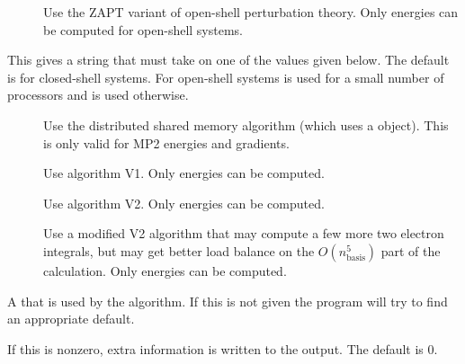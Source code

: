 \begin{description}
\begin{description}
        \item[] Use the ZAPT variant of open-shell perturbation
           theory.  Only energies can be computed for open-shell systems.

     \end{description}

  \item[\keywd{algorithm}] This gives a string that must take on one of the
     values given below.  The default is  for closed-shell
     systems.  For open-shell systems  is used for a small number
     of processors and  is used otherwise.

     \begin{description}

        \item[] Use the distributed shared memory algorithm
          (which uses a  object).  This is only valid
          for MP2 energies and gradients.

        \item[] Use algorithm V1.  Only energies can be
          computed.

        \item[] Use algorithm V2.  Only energies can be
          computed.

        \item[] Use a modified V2 algorithm that may compute a
           few more two electron integrals, but may get better load balance
           on the $O(n_\mathrm{basis}^5)$ part of the calculation.  Only
           energies can be computed.

     \end{description}

  \item[\keywd{memorygrp}] A 
      that is used by the 
     algorithm.  If this is not given the program will try to find an
     appropriate default.

  \item[\keywd{debug}] If this is nonzero, extra information is written to
     the output.  The default is 0.

\end{description}

